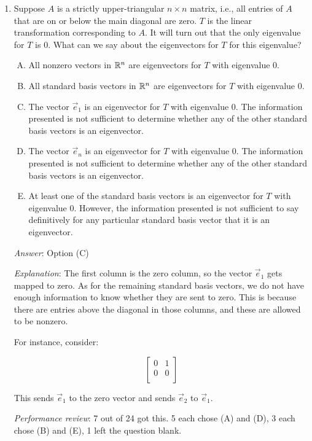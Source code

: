 \documentclass[10pt]{amsart}
\begin{document}
\begin{enumerate}
\item Suppose $A$ is a strictly upper-triangular $n \times n$ matrix,
  i.e., all entries of $A$ that are on or below the main diagonal are
  zero. $T$ is the linear transformation corresponding to $A$. It will
  turn out that the only eigenvalue for $T$ is $0$. What can we say
  about the eigenvectors for $T$ for this eigenvalue?

  \begin{enumerate}[(A)]
  \item All nonzero vectors in $\mathbb{R}^n$ are eigenvectors for $T$ with
    eigenvalue $0$.
  \item All standard basis vectors in $\mathbb{R}^n$ are eigenvectors for $T$
    with eigenvalue $0$.
  \item The vector $\vec{e}_1$ is an eigenvector for $T$ with
    eigenvalue $0$. The information presented is not sufficient to
    determine whether any of the other standard basis vectors is an
    eigenvector.
  \item The vector $\vec{e}_n$ is an eigenvector for $T$ with
    eigenvalue $0$. The information presented is not sufficient to
    determine whether any of the other standard basis vectors is an
    eigenvector.
  \item At least one of the standard basis vectors is an eigenvector
    for $T$ with eigenvalue $0$. However, the information presented is
    not sufficient to say definitively for any particular standard
    basis vector that it is an eigenvector.
  \end{enumerate}

  {\em Answer}: Option (C)

  {\em Explanation}: The first column is the zero column, so the
  vector $\vec{e}_1$ gets mapped to zero. As for the remaining
  standard basis vectors, we do not have enough information to know
  whether they are sent to zero. This is because there are entries
  above the diagonal in those columns, and these are allowed to be
  nonzero.

  For instance, consider:

  $$\left[\begin{matrix} 0 & 1 \\ 0 & 0 \\\end{matrix}\right]$$

  This sends $\vec{e}_1$ to the zero vector and sends $\vec{e}_2$ to
  $\vec{e}_1$.

  {\em Performance review}: 7 out of 24 got this. 5 each chose (A) and
  (D), 3 each chose (B) and (E), 1 left the question blank.


\end{enumerate}
\end{document}
